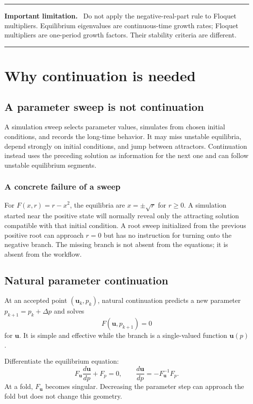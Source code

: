 \documentclass[11pt,oneside]{book}
\newcommand{\state}{\bm{u}}
\newcommand{\residual}{F}
\newenvironment{warningbox}
  {\par\medskip\noindent\begin{minipage}{\textwidth}
   \color{JaxRed}\rule{\textwidth}{0.8pt}\par
   \textbf{Important limitation.}\ \color{black}}
  {\par\color{JaxRed}\rule{\textwidth}{0.8pt}
   \end{minipage}\par\medskip}
\begin{document}
\begin{warningbox}
Do not apply the negative-real-part rule to Floquet multipliers. Equilibrium
eigenvalues are continuous-time growth rates; Floquet multipliers are
one-period growth factors. Their stability criteria are different.
\end{warningbox}

\chapter{Why continuation is needed}

\section{A parameter sweep is not continuation}

A simulation sweep selects parameter values, simulates from chosen initial
conditions, and records the long-time behavior. It may miss unstable
equilibria, depend strongly on initial conditions, and jump between attractors.
Continuation instead uses the preceding solution as information for the next
one and can follow unstable equilibrium segments.

\subsection{A concrete failure of a sweep}

For $F(x,r)=r-x^2$, the equilibria are $x=\pm\sqrt r$ for $r\ge0$. A simulation
started near the positive state will normally reveal only the attracting
solution compatible with that initial condition. A root sweep initialized from
the previous positive root can approach $r=0$ but has no instruction for
turning onto the negative branch. The missing branch is not absent from the
equations; it is absent from the workflow.

\section{Natural parameter continuation}

At an accepted point $(\state_k,p_k)$, natural continuation predicts a new
parameter $p_{k+1}=p_k+\Delta p$ and solves
\[
  \residual(\state,p_{k+1})=0
\]
for $\state$. It is simple and effective while the branch is a single-valued
function $\state(p)$.

Differentiate the equilibrium equation:
\[
  \residual_{\state}\frac{d\state}{dp}+\residual_p=0,
  \qquad
  \frac{d\state}{dp}=-\residual_{\state}^{-1}\residual_p.
\]
At a fold, $\residual_{\state}$ becomes singular. Decreasing the parameter step
can approach the fold but does not change this geometry.
\end{document}
